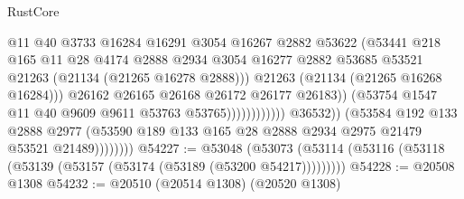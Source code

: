 \begin{lexlean}{RustCore}
\begin{coremodule}
                                                @11
                                                @40
                                                @3733
                                                @16284
                                                @16291
                                                @3054
                                                @16267
                                                @2882
                                                @53622
                                                (@53441
                                                  @218
                                                  @165
                                                  @11
                                                  @28
                                                  @4174
                                                  @2888
                                                  @2934
                                                  @3054
                                                  @16277
                                                  @2882
                                                  @53685
                                                  @53521
                                                  @21263
                                                  (@21134 (@21265 @16278 @2888)))
                                                @21263
                                                (@21134 (@21265 @16268 @16284)))
                                              @26162
                                              @26165
                                              @26168
                                              @26172
                                              @26177
                                              @26183))
                                          (@53754
                                            @1547
                                            @11
                                            @40
                                            @9609
                                            @9611
                                            @53763
                                            @53765))))))))))))
                    @36532))
                (@53584
                  @192
                  @133
                  @2888
                  @2977
                  (@53590 @189 @133 @165 @28 @2888 @2934 @2975 @21479 @53521 @21489))))))))
@54227 := @53048
    (@53073 (@53114 (@53116 (@53118 (@53139 (@53157 (@53174 (@53189 (@53200 @54217)))))))))
@54228 := @20508 @1308
@54232 := @20510 (@20514 @1308) (@20520 @1308)

\end{coremodule}
\end{lexlean}
